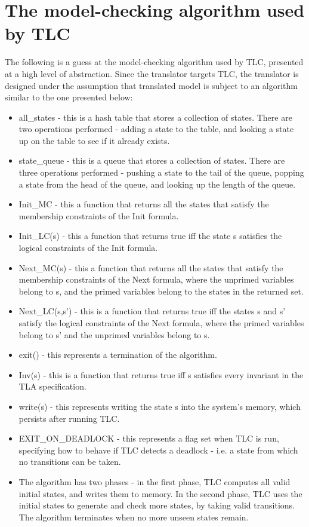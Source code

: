 \section{The model-checking algorithm used by TLC}

The following is a guess at the model-checking algorithm used by TLC, presented at a high level of abstraction. Since the translator targets TLC, the translator is designed under the assumption that translated model is subject to an algorithm similar to the one presented below:

\begin{itemize}
  \item all\_states - this is a hash table that stores a collection of states. There are two operations performed - adding a state to the table, and looking a state up on the table to see if it already exists.
  \item state\_queue - this is a queue that stores a collection of states. There are three operations performed - pushing a state to the tail of the queue, popping a state from the head of the queue, and looking up the length of the queue.
  \item Init\_MC - this a function that returns all the states that satisfy the membership constraints of the Init formula.
  \item Init\_LC(s) - this a function that returns true iff the state s satisfies the logical constraints of the Init formula.
  \item Next\_MC(s) - this a function that returns all the states that satisfy the membership constraints of the Next formula, where the unprimed variables belong to s, and the primed variables belong to the states in the returned set.
  \item Next\_LC(s,s') - this is a function that returns true iff the states s and s' satisfy the logical constraints of the Next formula, where the primed variables belong to s' and the unprimed variables belong to s.
  \item exit() - this represents a termination of the algorithm.
  \item Inv(s) - this is a function that returns true iff s satisfies every invariant in the TLA specification.
  \item write(s) - this represents writing the state s into the system's memory, which persists after running TLC.
  \item EXIT\_ON\_DEADLOCK - this represents a flag set when TLC is run, specifying how to behave if TLC detects a deadlock - i.e. a state from which no transitions can be taken.
  \item

The algorithm has two phases - in the first phase, TLC computes all valid initial states, and writes them to memory. In the second phase, TLC uses the initial states to generate and check more states, by taking valid transitions. The algorithm terminates when no more unseen states remain.


\end{itemize}


